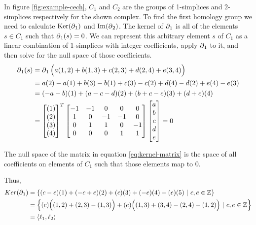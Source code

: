 \begin{example}
    In figure \ref{fig:example-cech}, \(C_1\) and \(C_2\) are the groups of 1-simplices and 2-simplices respectively for the shown complex.
    To find the first homology group we need to calculate \(\operatorname{Ker}(\operatorname{\partial}_1)\) and \(\operatorname{Im}(\operatorname{\partial}_2)\).
    The kernel of \(\operatorname{\partial}_1\) is all of the elements \(s \in C_1\) such that \(\operatorname{\partial}_1(s) = 0\).
    We can represent this arbitrary element \(s\) of \(C_1\) as a linear combination of 1-simplices with integer coefficients, apply \(\operatorname{\partial}_1\) to it, and then solve for the null space of those coefficients.
    \begin{align}
        \operatorname{\partial}_1(s) &= \operatorname{\partial}_1\Big( a(1,2) + b(1,3) + c(2,3) + d(2,4) + e(3,4) \Big) \\
        &= a(2) - a(1) + b(3) - b(1) + c(3) - c(2) + d(4) - d(2) + e(4) - e(3)\\
        &= (-a - b)(1) + (a - c - d)(2) + (b + c - e)(3) + (d + e)(4) \\
        &=  \begin{bmatrix}
                (1)\\(2)\\(3)\\(4)\\
            \end{bmatrix}^T
            \begin{bmatrix}
                -1 & -1 &  0 &  0 &  0 \\
                1 &  0 & -1 & -1 &  0 \\
                0 &  1 &  1 &  0 & -1 \\
                0 &  0 &  0 &  1 &  1 \\
            \end{bmatrix}
            \begin{bmatrix}
                a\\b\\c\\d\\e\\
            \end{bmatrix}
        = 0 \label{eq:kernel-matrix}
    \end{align}

    The null space of the matrix in equation \eqref{eq:kernel-matrix} is the space of all coefficients on elements of \(C_1\) such that those elements map to 0.

    Thus,
    \begin{align}
        Ker(\operatorname{\partial}_1) &= \{ (c - e)(1) + (-c + e)(2) + (c)(3) + (-e)(4) + (e)(5)\ |\ c,e \in \mathbb{Z} \}\\
            &= \left\{ (c)\Big( (1,2) + (2,3) - (1,3)\Big) + (e)\Big((1,3) + (3,4) - (2,4) - (1,2)\Big)\ |\ c,e \in \mathbb{Z} \right\}\\
            &= \langle \ell_1, \ell_2 \rangle
    \end{align}


\end{example}
